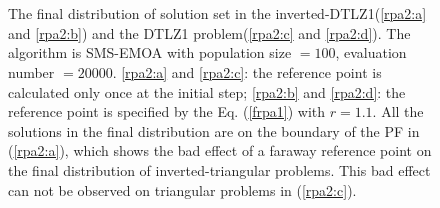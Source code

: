 \documentclass[conference]{IEEEtran}
\begin{document}
\begin{figure}[!t]
  \centering
  \quad
  \\
  \quad
  \\
  \caption{The final distribution of solution set in the inverted-DTLZ1(\ref{rpa2:a} and \ref{rpa2:b}) 
  and the DTLZ1 problem(\ref{rpa2:c} and \ref{rpa2:d}).
  The algorithm is SMS-EMOA with population size $= 100$, evaluation number $= 20000$. 
  \ref{rpa2:a} and \ref{rpa2:c}: the reference point is calculated only once at the initial step;
  \ref{rpa2:b} and \ref{rpa2:d}: the reference point is specified by the Eq. (\ref{frpa1}) with $r=1.1$.
  All the solutions in the final distribution are on the boundary of the PF in (\ref{rpa2:a}),
  which shows the bad effect of a faraway reference point
  on the final distribution of inverted-triangular problems.
  This bad effect can not be observed on triangular problems in (\ref{rpa2:c}).
  }
  \label{rpa2}
\end{figure}
\end{document}
